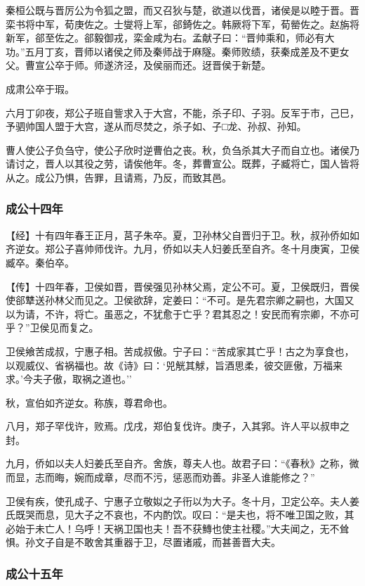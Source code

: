\documentclass[]{article}
\begin{document}
秦桓公既与晋厉公为令狐之盟，而又召狄与楚，欲道以伐晋，诸侯是以睦于晋。晋栾书将中军，荀庚佐之。士燮将上军，郤錡佐之。韩厥将下军，荀罃佐之。赵旃将新军，郤至佐之。郤毅御戎，栾金咸为右。孟献子曰：``晋帅乘和，师必有大功。''五月丁亥，晋师以诸侯之师及秦师战于麻隧。秦师败绩，获秦成差及不更女父。曹宣公卒于师。师遂济泾，及侯丽而还。迓晋侯于新楚。

成肃公卒于瑕。

六月丁卯夜，郑公子班自訾求入于大宫，不能，杀子印、子羽。反军于市，己巳，予驷帅国人盟于大宫，遂从而尽焚之，杀子如、子□龙、孙叔、孙知。

曹人使公子负刍守，使公子欣时逆曹伯之丧。秋，负刍杀其大子而自立也。诸侯乃请讨之，晋人以其役之劳，请俟他年。冬，葬曹宣公。既葬，子臧将亡，国人皆将从之。成公乃惧，告罪，且请焉，乃反，而致其邑。

\hypertarget{header-n1705}{%
\subsubsection{成公十四年}\label{header-n1705}}

【经】十有四年春王正月，莒子朱卒。夏，卫孙林父自晋归于卫。秋，叔孙侨如如齐逆女。郑公子喜帅师伐许。九月，侨如以夫人妇姜氏至自齐。冬十月庚寅，卫侯臧卒。秦伯卒。

【传】十四年春，卫侯如晋，晋侯强见孙林父焉，定公不可。夏，卫侯既归，晋侯使郤犨送孙林父而见之。卫侯欲辞，定姜曰：``不可。是先君宗卿之嗣也，大国又以为请，不许，将亡。虽恶之，不犹愈于亡乎？君其忍之！安民而宥宗卿，不亦可乎？''卫侯见而复之。

卫侯飨苦成叔，宁惠子相。苦成叔傲。宁子曰：``苦成家其亡乎！古之为享食也，以观威仪、省祸福也。故《诗》曰：`兕觥其觩，旨酒思柔，彼交匪傲，万福来求。'今夫子傲，取祸之道也。''

秋，宣伯如齐逆女。称族，尊君命也。

八月，郑子罕伐许，败焉。戊戌，郑伯复伐许。庚子，入其郛。许人平以叔申之封。

九月，侨如以夫人妇姜氏至自齐。舍族，尊夫人也。故君子曰：``《春秋》之称，微而显，志而晦，婉而成章，尽而不污，惩恶而劝善。非圣人谁能修之？''

卫侯有疾，使孔成子、宁惠子立敬姒之子衎以为大子。冬十月，卫定公卒。夫人姜氏既哭而息，见大子之不哀也，不内酌饮。叹曰：``是夫也，将不唯卫国之败，其必始于未亡人！乌呼！天祸卫国也夫！吾不获鱄也使主社稷。''大夫闻之，无不耸惧。孙文子自是不敢舍其重器于卫，尽置诸戚，而甚善晋大夫。

\hypertarget{header-n1715}{%
\subsubsection{成公十五年}\label{header-n1715}}
\end{document}
